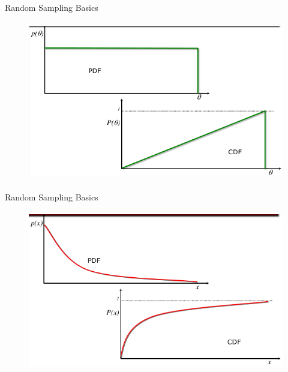 \documentclass[xcolor=x11names,compress, handouts]{beamer}
\renewcommand{\(}{\begin{columns}}
\renewcommand{\)}{\end{columns}}
\newcommand{\<}[1]{\begin{column}{#1}}
\renewcommand{\>}{\end{column}}
\begin{document}
\begin{frame}{Random Sampling Basics}

  	\begin{figure}
  	\begin{center}
  		\includegraphics[height=2.75in,clip]{../figs/cont-pdf-cdf}
	\end{center}
  	\end{figure}

\end{frame}


\begin{frame}{Random Sampling Basics}

  	\begin{figure}
  	\begin{center}
  		\includegraphics[height=2.75in,clip]{../figs/cont-pdf-cdf-2}
	\end{center}
  	\end{figure}

\end{frame}
\end{document}
